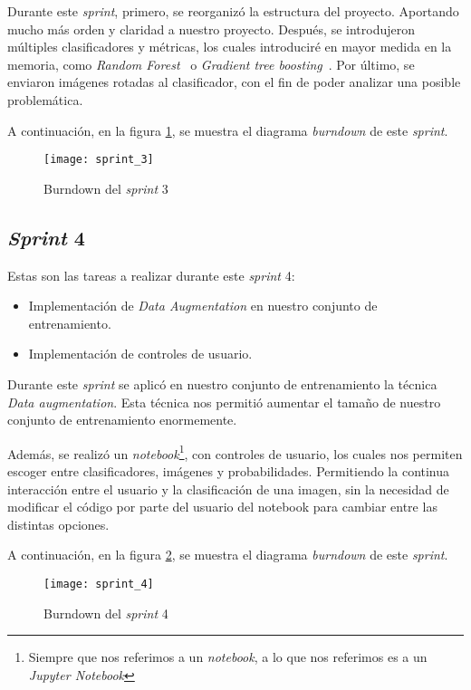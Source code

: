 Durante este \textit{sprint}, primero, se reorganizó la estructura del proyecto. Aportando mucho más orden y claridad a nuestro proyecto. Después, se introdujeron múltiples clasificadores y métricas, los cuales introduciré en mayor medida en la memoria, como \textit{Random Forest}~\cite{randomforest} o \textit{Gradient tree boosting}~\cite{gradientboosting}. Por último, se enviaron imágenes rotadas al clasificador, con el fin de poder analizar una posible problemática.

A continuación, en la figura \ref{fig:A.1.4}, se muestra el diagrama \textit{burndown} de este \textit{sprint}.

\begin{figure}
\centering
\texttt{[image: sprint\_3]}
\caption{Burndown del \textit{sprint} 3}
\label{fig:A.1.4}
\end{figure}

\subsection{\textit{Sprint} 4}
Estas son las tareas a realizar durante este \textit{sprint} 4:

\begin{itemize}
	\item Implementación de \textit{Data Augmentation} en nuestro conjunto de entrenamiento.
	\item Implementación de controles de usuario.
\end{itemize}

Durante este \textit{sprint} se aplicó en nuestro conjunto de entrenamiento la técnica \textit{Data augmentation}. Esta técnica nos permitió aumentar el tamaño de nuestro conjunto de entrenamiento enormemente. 

Además, se realizó un \textit{notebook}\footnote{Siempre que nos referimos a un \textit{notebook}, a lo que nos referimos es a un \textit{Jupyter Notebook}}, con controles de usuario, los cuales nos permiten escoger entre clasificadores, imágenes y probabilidades. Permitiendo la continua interacción entre el usuario y la clasificación de una imagen, sin la necesidad de modificar el código por parte del usuario del notebook para cambiar entre las distintas opciones.

A continuación, en la figura \ref{fig:A.1.5}, se muestra el diagrama \textit{burndown} de este \textit{sprint}.

\begin{figure}
\centering
\texttt{[image: sprint\_4]}
\caption{Burndown del \textit{sprint} 4}
\label{fig:A.1.5}
\end{figure}


